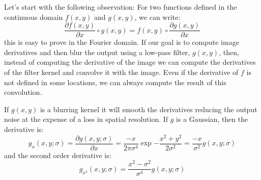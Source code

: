 Let's start with the following observation: For two functions defined in the continuous domain $f(x,y)$ and $g(x,y)$, we can write:
\begin{equation}
	\frac {\partial f(x,y)}{\partial x} \circ g(x,y) = f(x,y) \circ \frac {\partial g(x,y)}{\partial x}
\end{equation}
this is easy to prove in the Fourier domain. If our goal is to compute image derivatives and then blur the output using a low-pass filter, $g(x,y)$, then, instead of computing the derivative of the image we can compute the derivatives of the filter kernel and convolve it with the image. Even if the derivative of $f$ is not defined in some locations, we can always compute the result of this convolution.

If $g(x,y)$ is a blurring kernel it will smooth the derivatives reducing the output noise at the expense of a loss in spatial resolution. If $g$ is a Gaussian, then the derivative is:
\begin{equation}
	g_x(x,y; \sigma) = \frac {\partial g(x,y; \sigma)}{\partial x}= \frac{-x}{2 \pi \sigma^4} \exp{-\frac{x^2 +
			y^2}{2 \sigma^2}} = \frac{-x}{\sigma^2} g(x,y; \sigma)
	\label{eq:derivate1gauss2dcont}
\end{equation}
and the second order derivative is:
\begin{equation}
	g_{x^2}(x,y; \sigma) = \frac{x^2-\sigma^2}{\sigma^4} g(x,y; \sigma)
	\label{eq:derivate2gauss2dcont}
\end{equation}

